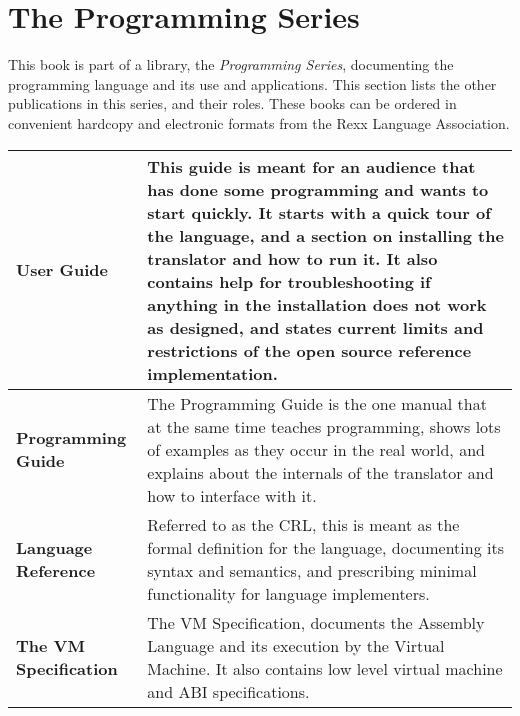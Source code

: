 \chapter{The \crexx{} Programming Series}
This book is part of a library, the \emph{\crexx{} Programming Series}, documenting the \crexx{} programming language and its use and applications. This section lists the other publications in this series, and their roles. These books can be ordered in convenient hardcopy and electronic formats from the Rexx Language Association.
\newline
\newline
\begin{tabularx}{\textwidth}{>{\bfseries}lX}
\toprule
User Guide & This guide is meant for an audience that has done some programming and wants to start quickly. It starts with a quick tour of the language, and a section on installing the \crexx{} translator and how to run it. It also contains help for troubleshooting if anything in the installation does not work as designed, and states current limits and restrictions of the open source reference implementation.
\\\midrule
Programming Guide & The Programming Guide is the one manual that at the same time teaches programming, shows lots of examples as they occur in the real world, and explains about the internals of the translator and how to interface with it.
\\\midrule
Language Reference & Referred to as the CRL, this is meant as the formal definition for the language, documenting its syntax and semantics, and prescribing minimal functionality for language implementers.
\\\midrule
The \crexx{} VM Specification & The \crexx{} VM
Specification, documents the \crexx{} Assembly Language and its execution
by the \crexx{} Virtual Machine. It also contains low level virtual
machine and ABI specifications.
\\\bottomrule
\end{tabularx}
